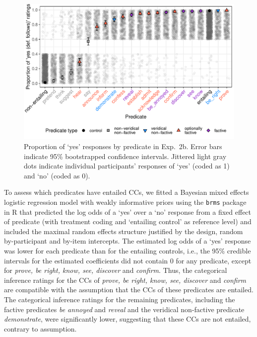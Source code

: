 \documentclass[11pt,fleqn]{article}
\newcommand{\6}{\mbox{$[\hspace*{-.6mm}[$}}
\newcommand{\9}{\mbox{$]\hspace*{-.6mm}]$}}
\begin{document}
\begin{figure}[h!]
\centering
\includegraphics[width=.7\paperwidth]{../../results/7-veridicality3-binary/graphs/proportion-by-predicate-variability-individual}

\caption{Proportion of `yes' responses by predicate in Exp.~2b. Error bars indicate 95\% bootstrapped confidence intervals. Jittered light gray dots indicate individual participants' responses of `yes' (coded as 1) and `no' (coded as 0).}
\label{fig:2bresults}
\end{figure}

To assess which predicates have entailed CCs, we fitted a Bayesian mixed effects logistic regression model with weakly informative priors using the \verb|brms|  package in R that predicted the log odds of a `yes' over a `no' response from a fixed effect of predicate (with treatment coding and `entailing control' as  reference level) and included the maximal random effects structure justified by the design, random by-participant and by-item intercepts. The estimated log odds of a `yes' response was lower for each predicate than for the entailing controls, i.e., the 95\% credible intervals for the estimated coefficients did not contain 0 for any predicate, except for {\em prove, be right, know, see, discover} and {\em confirm}. Thus, the categorical inference ratings for the CCs of {\em prove, be right, know, see, discover} and {\em confirm} are compatible with the assumption that the CCs of these predicates are entailed. The categorical inference ratings for the remaining predicates, including the factive predicates {\em be annoyed} and {\em reveal} and the veridical non-factive predicate {\em demonstrate}, were significantly lower, suggesting that these CCs are not entailed, contrary to assumption. 
\end{document}
